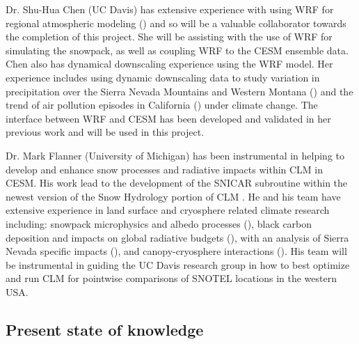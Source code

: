 \documentclass[11pt]{article}
\begin{document}
Dr. Shu-Hua Chen (UC Davis) has extensive experience with using WRF for regional atmospheric modeling (\cite{chen2011observing,xu2014coupling, yang2014evaluating, zhang2014development}) and so will be a valuable collaborator towards the completion of this project. She will be assisting with the use of WRF for simulating the snowpack, as well as coupling WRF to the CESM ensemble data.  Chen also has dynamical downscaling experience using the WRF model. Her experience includes using dynamic downscaling data to study variation in precipitation over the Sierra Nevada Mountains and Western Montana (\cite{pan2011influences, silverman2013dynamically}) and the trend of air pollution episodes in California (\cite{zhao2011impactb, zhao2011impacta}) under climate change. The interface between WRF and CESM has been developed and validated in her previous work and will be used in this project.

Dr. Mark Flanner (University of Michigan) has been instrumental in helping to develop and enhance snow processes and radiative impacts within CLM in CESM.  His work lead to the development of the SNICAR subroutine within the newest version of the Snow Hydrology portion of CLM \citep{lawrence2011parameterization,lawrence2012ccsm4}.  He and his team have extensive experience in land surface and cryosphere related climate research including: snowpack microphysics and albedo processes (\cite{flanner2006linking, flanner2011radiative, kuipers2011new}), black carbon deposition and impacts on global radiative budgets (\cite{flanner2007present,mcconnell200720th,flanner2009springtime,flanner2012enhanced,flanner2013arctic,qian2015light}), with an analysis of Sierra Nevada specific impacts (\cite{sterle2013retention}), and canopy-cryosphere interactions (\cite{perket2014diagnosing}).  His team will be instrumental in guiding the UC Davis research group in how to best optimize and run CLM for pointwise comparisons of SNOTEL locations in the western USA. 


\subsection{Present state of knowledge}
\end{document}

